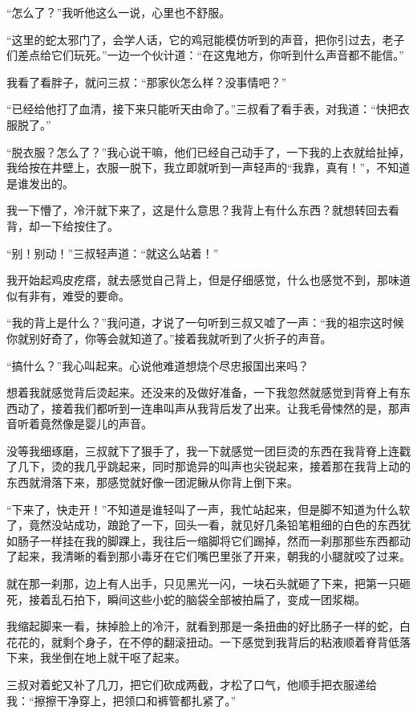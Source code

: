 “怎么了？”我听他这么一说，心里也不舒服。

“这里的蛇太邪门了，会学人话，它的鸡冠能模仿听到的声音，把你引过去，老子们差点给它们玩死。”一边一个伙计道：“在这鬼地方，你听到什么声音都不能信。”

我看了看胖子，就问三叔：“那家伙怎么样？没事情吧？”

“已经给他打了血清，接下来只能听天由命了。”三叔看了看手表，对我道：“快把衣服脱了。”

“脱衣服？怎么了？”我心说干嘛，他们已经自己动手了，一下我的上衣就给扯掉，我给按在井壁上，衣服一脱下，我立即就听到一声轻声的“我靠，真有！”，不知道是谁发出的。

我一下懵了，冷汗就下来了，这是什么意思？我背上有什么东西？就想转回去看背，却一下给按住了。

“别！别动！”三叔轻声道：“就这么站着！”

我开始起鸡皮疙瘩，就去感觉自己背上，但是仔细感觉，什么也感觉不到，那味道似有非有，难受的要命。

“我的背上是什么？”我问道，才说了一句听到三叔又嘘了一声：“我的祖宗这时候你就别好奇了，你等会就知道了。”接着我就听到了火折子的声音。

“搞什么？”我心叫起来。心说他难道想烧个尽忠报国出来吗？

想着我就感觉背后烫起来。还没来的及做好准备，一下我忽然就感觉到背脊上有东西动了，接着我们都听到一连串叫声从我背后发了出来。让我毛骨悚然的是，那声音听着竟然像是婴儿的声音。

没等我细琢磨，三叔就下了狠手了，我一下就感觉一团巨烫的东西在我背脊上连戳了几下，烫的我几乎跳起来，同时那诡异的叫声也尖锐起来，接着那在我背上动的东西就滑落下来，那感觉就好像一团泥鳅从你背上倒下来。

“下来了，快走开！”不知道是谁轻叫了一声，我忙站起来，但是脚不知道为什么软了，竟然没站成功，踉跄了一下，回头一看，就见好几条铅笔粗细的白色的东西犹如肠子一样挂在我的脚踝上，我往后一缩脚将它们踢掉，然而一刹那那些东西都动了起来，我清晰的看到那小毒牙在它们嘴巴里张了开来，朝我的小腿就咬了过来。

就在那一刹那，边上有人出手，只见黑光一闪，一块石头就砸了下来，把第一只砸死，接着乱石拍下，瞬间这些小蛇的脑袋全部被拍扁了，变成一团浆糊。

我缩起脚来一看，抹掉脸上的冷汗，就看到那是一条扭曲的好比肠子一样的蛇，白花花的，就剩个身子，在不停的翻滚扭动。一下感觉到我背后的粘液顺着脊背低落下来，我坐倒在地上就干呕了起来。

三叔对着蛇又补了几刀，把它们砍成两截，才松了口气，他顺手把衣服递给我：“擦擦干净穿上，把领口和裤管都扎紧了。”

